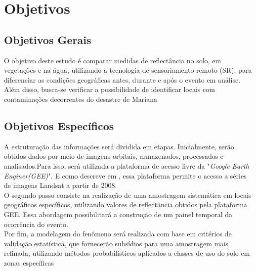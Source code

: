 
\section{ Objetivos}
%
\subsection{ Objetivos Gerais}
%
\hspace*{1.25 cm} O objetivo deste estudo é comparar medidas de reflectância no solo, em vegetações e na água, utilizando a tecnologia de sensoriamento remoto (SR), para diferenciar as condições geográficas antes, durante e após o evento em análise. Além disso, busca-se verificar a possibilidade de identificar locais com contaminações decorrentes do desastre de Mariana\\
\subsection{ Objetivos Específicos}

 \hspace*{1.25 cm} A estruturação das informações será dividida em etapas. Inicialmente, serão obtidos dados por meio de imagens orbitais, armazenados, processados e analisados.Para isso, será utilizada a plataforma de acesso livre da "\textit{Google Earth Enginer(GEE)}". E como descreve em \cite[p.1]{Mutanga}, essa plataforma permite o acesso a séries de imagens Landsat a partir de 2008.\\
%
 \hspace*{1.25 cm} O segundo passo consiste na realização de uma amostragem sistemática em locais geográficos específicos, utilizando valores de reflectância obtidos pela plataforma GEE. Essa abordagem possibilitará a construção de um painel temporal da ocorrência do evento.\\
% 
 \hspace*{1.25 cm} Por fim, a modelagem do fenômeno será realizada com base em critérios de validação estatística, que fornecerão subsídios para uma amostragem mais refinada, utilizando métodos probabilísticos aplicados a classes de uso do solo em zonas específicas\\
% 
 
  

	

